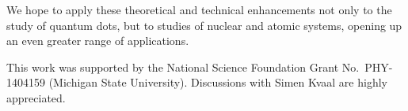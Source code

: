 \documentclass[aip, jcp, 12pt]{revtex4-1}
\begin{document}
We hope to apply these theoretical and technical enhancements not only to the study of quantum dots, but to studies of nuclear and atomic systems, opening up an even greater range of applications.

\begin{acknowledgments}
  This work was supported by the National Science Foundation Grant No.\ PHY-1404159 (Michigan State University).  Discussions with Simen Kvaal are highly appreciated.
\end{acknowledgments}


\end{document}

